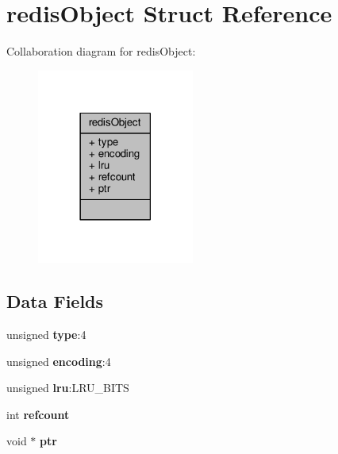 \hypertarget{structredisObject}{}\section{redis\+Object Struct Reference}
\label{structredisObject}


Collaboration diagram for redis\+Object\+:\nopagebreak
\begin{figure}[H]
\begin{center}
\leavevmode
\includegraphics[width=146pt]{structredisObject__coll__graph}
\end{center}
\end{figure}
\subsection*{Data Fields}
\begin{DoxyCompactItemize}
\item 
\mbox{\label{structredisObject_a36beebc5584570a6614f8b49047ed5e5}} 
unsigned {\bfseries type}\+:4
\item 
\mbox{\label{structredisObject_a0d8afcc7231d2741ed0d03de1e4db170}} 
unsigned {\bfseries encoding}\+:4
\item 
\mbox{\label{structredisObject_aa8b713f8af4c49db1d70d646a11d2280}} 
unsigned {\bfseries lru}\+:L\+R\+U\+\_\+\+B\+I\+TS
\item 
\mbox{\label{structredisObject_ae9b12c2f70ff2319cb6c7bbc94e7a697}} 
int {\bfseries refcount}
\item 
\mbox{\label{structredisObject_afd47ef25b9b334ae5e18fbc56751e894}} 
void $\ast$ {\bfseries ptr}
\end{DoxyCompactItemize}


